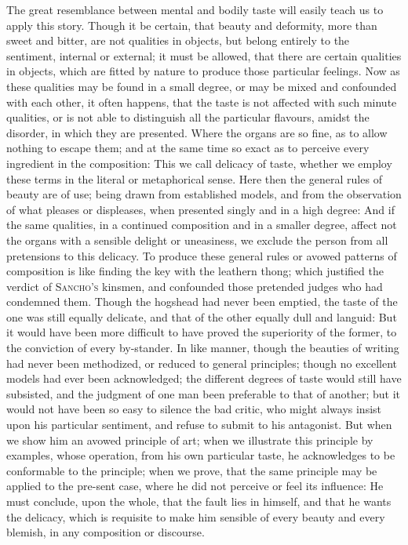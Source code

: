 The great resemblance between mental and bodily taste will
easily teach us to apply this story. Though it be certain, that beauty
and deformity, more than sweet and bitter, are not qualities in
objects, but belong entirely to the sentiment, internal or external;
it must be allowed, that there are certain qualities in objects, which
are fitted by nature to produce those particular feelings. Now as
these qualities may be found in a small degree, or may be mixed and
confounded with each other, it often happens, that the taste is not
affected with such minute qualities, or is not able to distinguish all
the particular flavours, amidst the disorder, in which they are
presented. Where the organs are so fine, as to allow nothing to escape
them; and at the same time so exact as to perceive every ingredient in
the composition: This we call delicacy of taste, whether we employ
these terms in the literal or metaphorical sense. Here then the
general rules of beauty are of use; being drawn from established
models, and from the observation of what pleases or displeases, when
presented singly and in a high degree: And if the same qualities, in a
continued composition and in a smaller degree, affect not the organs
with a sensible delight or uneasiness, we exclude the person from all
pretensions to this delicacy. To produce these general rules or avowed
patterns of composition is like finding the key with the leathern
thong; which justified the verdict of \textsc{Sancho's} kinsmen, and
confounded those pretended judges who had condemned them. Though the
hogshead had never been emptied, the taste of the one was still
equally delicate, and that of the other equally dull and languid: But
it would have been more difficult to have proved the superiority of
the former, to the conviction of every by-stander. In like manner,
though the beauties of writing had never been methodized, or reduced
to general principles; though no excellent models had ever been
acknowledged; the different degrees of taste would still have
subsisted, and the judgment of one man been preferable to that of
another; but it would not have been so easy to silence the bad critic,
who might always insist upon his particular sentiment, and refuse to
submit to his antagonist. But when we show him an avowed principle of
art; when we illustrate this principle by examples, whose operation,
from his own particular taste, he acknowledges to be conformable to
the principle; when we prove, that the same principle may be applied
to the pre-sent case, where he did not perceive or feel its
influence: He must conclude, upon the whole, that the fault lies in
himself, and that he wants the delicacy, which is requisite to make
him sensible of every beauty and every blemish, in any composition or
discourse.

